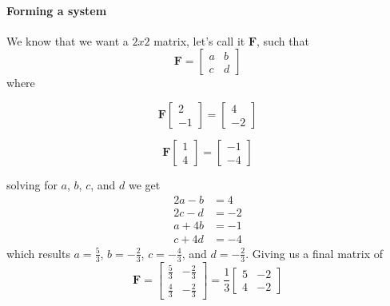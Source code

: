 \documentclass{article}
\begin{document}
            \paragraph{Forming a system}
                We know that we want a $2x2$ matrix, let's call it $\mathbf{F}$, such that
                \[
                    \mathbf{F}=\begin{bmatrix}a & b\\c & d\end{bmatrix}
                \]
                where
                \begin{center}
                \begin{minipage}{0.49\textwidth}
                    \centering
                    \[
                        \mathbf{F}\begin{bmatrix}2\\-1\end{bmatrix}=\begin{bmatrix}4\\-2\end{bmatrix}
                    \]
                \end{minipage}\hfill
                \begin{minipage}{0.49\textwidth}
                    \centering
                    \[ \mathbf{F}\begin{bmatrix}1\\4\end{bmatrix}=\begin{bmatrix}-1\\-4\end{bmatrix} \]
                \end{minipage}
                \end{center}
                solving for $a$, $b$, $c$, and $d$ we get
                \begin{align*}
                    2a-b&=4\\
                    2c-d&=-2\\
                    a+4b&=-1\\
                    c+4d&=-4
                \end{align*}
                which results $a=\frac{5}{3}$, $b=-\frac{2}{3}$, $c=-\frac{4}{3}$, and $d=-\frac{2}{3}$.
                Giving us a final matrix of
                \[
                    \mathbf{F}=\begin{bmatrix}\frac{5}{3} & -\frac{2}{3} \\ \frac{4}{3} & -\frac{2}{3}\end{bmatrix}
                    =
                    \frac{1}{3}\begin{bmatrix}5 & -2 \\ 4 & -2\end{bmatrix}
                \]
\end{document}
